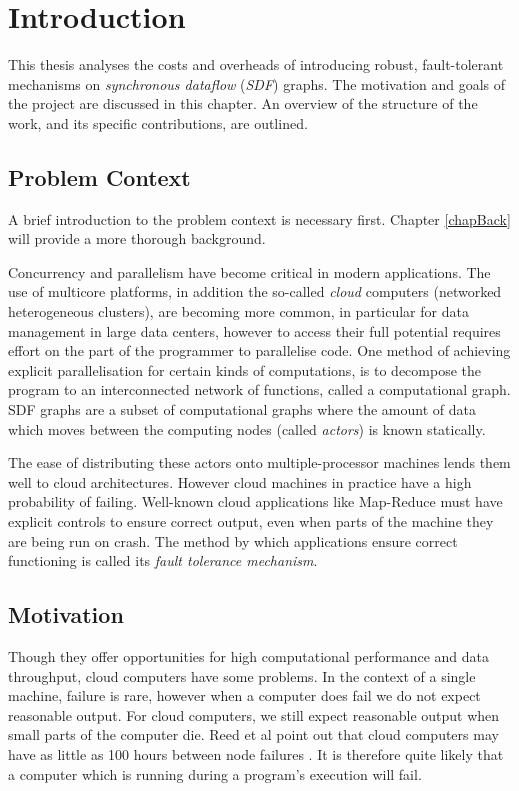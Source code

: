 \chapter{Introduction}

This thesis analyses the costs and overheads of introducing robust, fault-tolerant mechanisms on {\em synchronous dataflow} ({\em SDF}) graphs.
The motivation and goals of the project are discussed in this chapter.
An overview of the structure of the work, and its specific contributions, are outlined.

\section{Problem Context}

A brief introduction to the problem context is necessary first.
Chapter \ref{chapBack} will provide a more thorough background.

Concurrency and parallelism have become critical in modern applications.
The use of multicore platforms, in addition the so-called {\em cloud} computers (networked heterogeneous clusters), are becoming more common, in particular for data management in large data centers, however to access their full potential requires effort on the part of the programmer to parallelise code.
One method of achieving explicit parallelisation for certain kinds of computations, is to decompose the program to an interconnected network of functions, called a computational graph.
SDF graphs are a subset of computational graphs where the amount of data which moves between the computing nodes (called {\em actors}) is known statically.

The ease of distributing these actors onto multiple-processor machines lends them well to cloud architectures.
However cloud machines in practice have a high probability of failing.
Well-known cloud applications like Map-Reduce must have explicit controls to ensure correct output, even when parts of the machine they are being run on crash.
The method by which applications ensure correct functioning is called its {\em fault tolerance mechanism}.

\section{Motivation}

Though they offer opportunities for high computational performance and data throughput, cloud computers have some problems.
In the context of a single machine, failure is rare, however when a computer does fail we do not expect reasonable output.
For cloud computers, we still expect reasonable output when small parts of the computer die.
Reed et al point out that cloud computers may have as little as 100 hours between node failures \cite{ree06}.
It is therefore quite likely that a computer which is running during a program's execution will fail.

